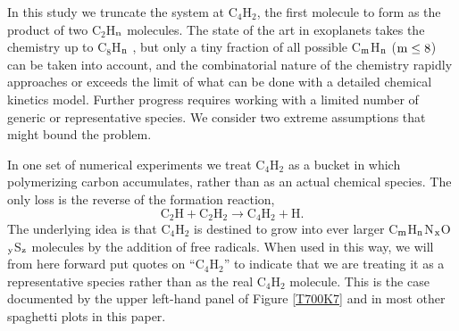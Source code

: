 \documentclass[preprint]{aastex}
\newcounter{reaction}
\begin{document}
In this study we truncate the system at C$_4$H$_2$, the first molecule to form as the product of two C$_2$H$_{\rm n}$ molecules.
The state of the art in exoplanets takes the chemistry up to C$_8$H$_{\rm n}$ \citep{Moses2014,Venot2015,Rimmer2016}, but only a tiny fraction of all possible
C$_{\rm m}$H$_{\rm n}$ (${\rm m}\leq 8$) can be taken into account, and the combinatorial nature of the chemistry rapidly
approaches or exceeds the limit of what can be done with a detailed chemical kinetics model.
Further progress requires working with a limited number of generic or representative species.
We consider two extreme assumptions that might bound the problem.

In one set of numerical experiments we treat C$_4$H$_2$ as a bucket in which polymerizing
carbon accumulates, rather than as an actual chemical species.
The only loss is the reverse of the formation reaction,
\begin{equation}\tag{R57}
\mathrm{C}_2\mathrm{H} + \mathrm{C}_2\mathrm{H}_2 \rightarrow \mathrm{C}_4\mathrm{H}_2 + \mathrm{H}.
\end{equation} 
The underlying idea is that C$_4$H$_2$ is destined to grow into ever larger
C$_{\rm m}$H$_{\rm n}$N$_{\rm x}$O$_{\rm y}$S$_{\rm z}$ molecules by
the addition of free radicals.   
When used in this way, we will from here forward put quotes on ``C$_4$H$_2$'' to indicate that 
we are treating it as a representative species rather than as the real C$_4$H$_2$ molecule. 
This is the case documented by the upper left-hand panel of Figure \ref{T700K7} and in most other spaghetti plots in this paper.
 
\end{document}
